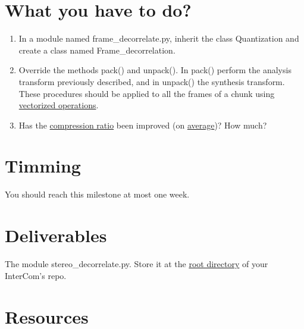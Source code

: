 \section{What you have to do?}

\begin{enumerate}
\item In a module named frame\_decorrelate.py, inherit the class
  Quantization and create a class named Frame\_decorrelation.
\item Override the methods pack() and unpack(). In pack() perform the
  analysis transform previously described, and in unpack() the
  synthesis transform. These procedures should be applied to all the
  frames of a chunk using
  \href{https://www.oreilly.com/library/view/python-for-data/9781449323592/ch04.html}{vectorized
    operations}.
\item Has the
  \href{https://en.wikipedia.org/wiki/Data_compression_ratio}{compression
    ratio} been improved (on
  \href{https://en.wikipedia.org/wiki/Average}{average})? How much?
\end{enumerate}

\section{Timming}

You should reach this milestone at most one week.

\section{Deliverables}

The module stereo\_decorrelate.py. Store it at the
\href{https://github.com/Tecnologias-multimedia/intercom}{root
  directory} of your InterCom's repo.

\section{Resources}


